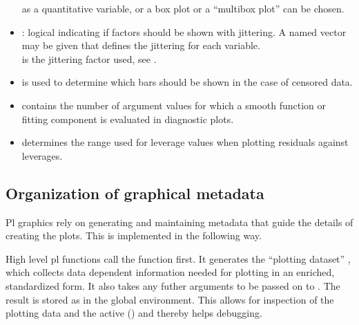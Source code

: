 \documentclass[11pt]{article}\usepackage[]{graphicx}\usepackage[]{color}
\begin{document}
\begin{itemize}
  as a quantitative variable, or a box plot or a ``multibox plot'' can be 
  chosen.
\item
  : logical indicating if factors should be shown with jittering.
  A named vector may be given that defines the jittering for each
  variable.\\ 
   is the jittering factor used, see .
\item
   is used to determine which bars should be shown
  in the case of censored data.
\item
   contains the number of argument values for which 
  a smooth function or fitting component is evaluated in diagnostic plots.
\item
   determines the range used for leverage values
  when plotting residuals against leverages.
\end{itemize}

\subsection{Organization of graphical metadata}
Pl graphics rely on generating and maintaining metadata that guide the
details of creating the plots. This is implemented in the following way.

High level pl functions call the function  first.
It generates the ``plotting dataset'' , which
collects data dependent information needed for plotting in an enriched,
standardized form. 
It also takes any futher arguments to be passed on to .
The result is stored as  in the global environment.
This allows for inspection of the plotting data
 and the active  ()
and thereby helps debugging.
\end{document}
